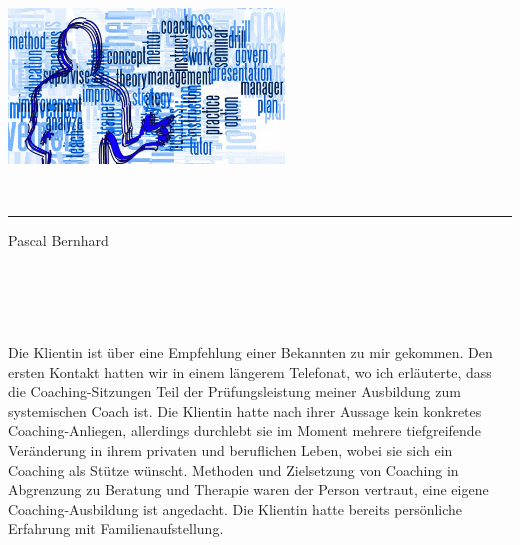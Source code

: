 \documentclass[11pt,a4paper]{article}
\begin{document}
\sffamily   %
\hfill%
\begin{minipage}[t]{.6\textwidth}
\raggedleft%
\includegraphics[width=0.55\textwidth]{Coaching-Logo_1280-720.jpg}


\end{minipage}\\[0.5em]
%
{\color{firstnamecolor}\rule{\textwidth}{.25ex}}
%
\begin{minipage}[t]{.4\textwidth}
	\raggedright%
	\vspace*{1em}

	\small%
\end{minipage}
%
\hfill
%
\begin{minipage}[t]{.4\textwidth}
	\raggedleft %
	Pascal Bernhard
\end{minipage}\\[2.2em]


{\bfseries {}}\\[0.75em]

\section*{\color{MidnightBlue}{Rahmeninformationen zur Klientin}}


Die Klientin ist über eine Empfehlung einer Bekannten zu mir gekommen. Den ersten Kontakt hatten wir in einem längerem Telefonat, wo ich erläuterte, dass die Coaching-Sitzungen Teil der Prüfungsleistung meiner Ausbildung zum systemischen Coach ist. Die Klientin hatte nach ihrer Aussage kein konkretes Coaching-Anliegen, allerdings durchlebt sie im Moment mehrere tiefgreifende Veränderung in ihrem privaten und beruflichen Leben, wobei sie sich ein Coaching als Stütze wünscht. Methoden und Zielsetzung von Coaching in Abgrenzung zu Beratung und Therapie waren der Person vertraut, eine eigene Coaching-Ausbildung ist angedacht. Die Klientin hatte bereits persönliche Erfahrung mit Familienaufstellung.
\end{document}
